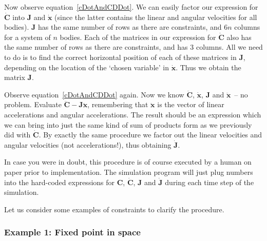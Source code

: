 Now observe equation~\ref{cDotAndCDDot}. We can easily factor our expression for
$\dot{\mathbf{C}}$ into $\mathbf{J}$ and $\dot{\mathbf{x}}$ (since the latter contains
the linear and angular velocities for all bodies). $\mathbf{J}$ has the same number of rows
as there are constraints, and $6n$ columns for a system of $n$ bodies. Each of the matrices
in our expression for $\dot{\mathbf{C}}$ also has the same number of rows as there are
constraints, and has 3 columns. All we need to do is to find the correct horizontal position
of each of these matrices in $\mathbf{J}$, depending on the location of the `chosen variable'
in $\dot{\mathbf{x}}$. Thus we obtain the matrix $\mathbf{J}$.

Observe equation~\ref{cDotAndCDDot} again. Now we know $\ddot{\mathbf{C}}$, $\dot{\mathbf{x}}$,
$\mathbf{J}$ and $\ddot{\mathbf{x}}$~-- no problem. Evaluate
$\ddot{\mathbf{C}} - \mathbf{J}\ddot{\mathbf{x}}$, remembering that $\ddot{\mathbf{x}}$ is
the vector of linear accelerations and angular accelerations. The result should be an
expression which we can bring into just the same kind of sum of products form as we previously
did with $\dot{\mathbf{C}}$. By exactly the same procedure we factor out the linear velocities
and angular velocities (not accelerations!), thus obtaining $\dot{\mathbf{J}}$.

In case you were in doubt, this procedure is of course executed by a human on paper prior to
implementation. The simulation program will just plug numbers into the hard-coded expressions
for $\mathbf{C}$, $\dot{\mathbf{C}}$, $\mathbf{J}$ and $\dot{\mathbf{J}}$ during each time step
of the simulation.

Let us consider some examples of constraints to clarify the procedure.

\subsubsection{Example 1: Fixed point in space}

